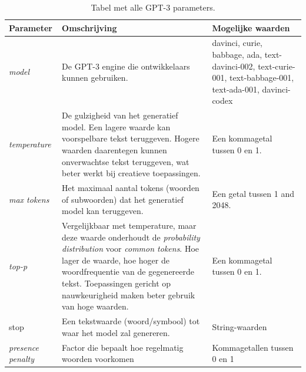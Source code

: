 \medspace

\begin{center}
	\begin{table}[H]
	\begin{tabular}{ m{3cm} | m{7cm} | m{4cm} }
		\hline
		\textbf{Parameter} & \textbf{Omschrijving} & \textbf{Mogelijke waarden} \\ \hline
		\textit{model} & De GPT-3 engine die ontwikkelaars kunnen gebruiken. & davinci, curie, babbage, ada, text-davinci-002, text-curie-001, text-babbage-001, text-ada-001, davinci-codex \\ \hline
		\textit{temperature} & De gulzigheid van het generatief model. Een lagere waarde kan voorspelbare tekst teruggeven. Hogere waarden daarentegen kunnen onverwachtse tekst teruggeven, wat beter werkt bij creatieve toepassingen. & Een kommagetal tussen 0 en 1. \\ \hline
		\textit{max tokens} & Het maximaal aantal tokens (woorden of subwoorden) dat het generatief model kan teruggeven. & Een getal tussen 1 and 2048. \\ \hline
		\textit{top-p} & Vergelijkbaar met temperature, maar deze waarde onderhoudt de \textit{probability distribution} voor \textit{common tokens}. Hoe lager de waarde, hoe hoger de woordfrequentie van de gegenereerde tekst. Toepassingen gericht op nauwkeurigheid maken beter gebruik van hoge waarden. & Een kommagetal tussen 0 en 1. \\
		\hline
		stop & Een tekstwaarde (woord/symbool) tot waar het model zal genereren. & String-waarden \\
		\hline
		\textit{presence penalty} & Factor die bepaalt hoe regelmatig woorden voorkomen & Kommagetallen tussen 0 en 1 \\
		\hline
	\end{tabular}
		\caption{Tabel met alle GPT-3 parameters.}
		\label{table:gpt-3-parameters}
	\end{table}
\end{center}

